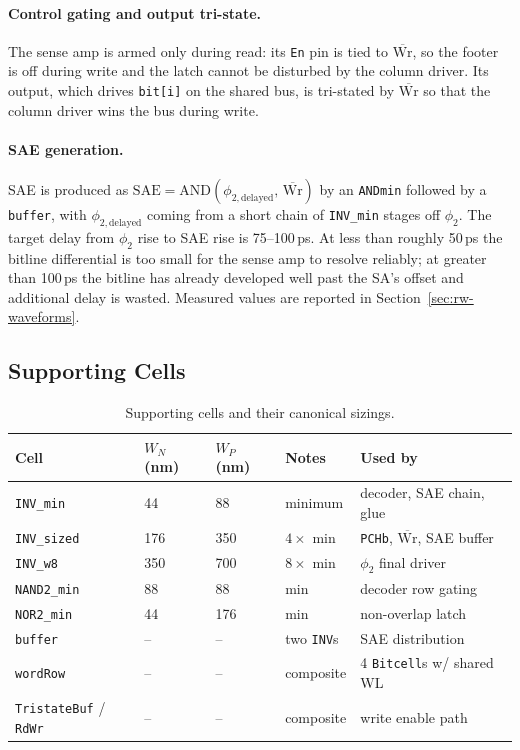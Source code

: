 \documentclass[11pt,letterpaper]{article}
\newcommand{\nWr}{\ensuremath{\overline{\text{Wr}}}}
\begin{document}
\paragraph{Control gating and output tri-state.} The sense amp is armed only
during read: its \texttt{En} pin is tied to $\nWr$, so the footer is off
during write and the latch cannot be disturbed by the column driver. Its
output, which drives \texttt{bit[i]} on the shared bus, is tri-stated by
$\nWr$ so that the column driver wins the bus during write.

\paragraph{SAE generation.} SAE is produced as
$\mathrm{SAE}=\mathrm{AND}(\phi_{2,\mathrm{delayed}},\,\nWr)$ by an
\texttt{ANDmin} followed by a \texttt{buffer}, with $\phi_{2,\mathrm{delayed}}$
coming from a short chain of \texttt{INV\_min} stages off $\phi_2$. The
target delay from $\phi_2$ rise to SAE rise is 75--100\,ps. At less than
roughly 50\,ps the bitline differential is too small for the sense amp to
resolve reliably; at greater than 100\,ps the bitline has already developed
well past the SA's offset and additional delay is wasted. Measured values
are reported in Section~\ref{sec:rw-waveforms}.

\subsection{Supporting Cells}
\label{sec:support}

\begin{table}[H]
  \centering
  \caption{Supporting cells and their canonical sizings.}
  \label{tab:support}
  \begin{tabular}{@{}lllll@{}}
    \toprule
    Cell & $W_N$ (nm) & $W_P$ (nm) & Notes & Used by \\
    \midrule
    \texttt{INV\_min}    & 44  & 88  & minimum & decoder, SAE chain, glue \\
    \texttt{INV\_sized}  & 176 & 350 & $4\times$ min & \texttt{PCHb}, $\nWr$, SAE buffer \\
    \texttt{INV\_w8}     & 350 & 700 & $8\times$ min & $\phi_2$ final driver \\
    \texttt{NAND2\_min}  & 88  & 88  & min        & decoder row gating \\
    \texttt{NOR2\_min}   & 44  & 176 & min        & non-overlap latch \\
    \texttt{buffer}      & --  & --  & two \texttt{INV}s & SAE distribution \\
    \texttt{wordRow}     & --  & --  & composite  & 4 \texttt{Bitcell}s w/ shared WL \\
    \texttt{TristateBuf} / \texttt{RdWr} & --  & --  & composite & write enable path \\
    \bottomrule
  \end{tabular}
\end{table}
\end{document}
